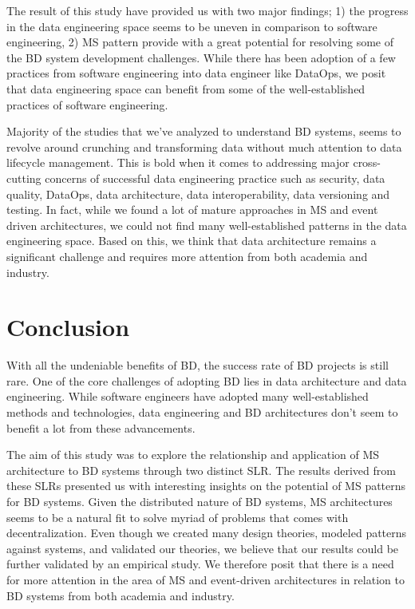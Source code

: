 \documentclass{bmcart}
\begin{document}
The result of this study have provided us with two major findings; 1) the progress in the data engineering space seems to be uneven in comparison to software engineering, 2) MS pattern provide with a great potential for resolving some of the BD system development challenges. While there has been adoption of a few practices from software engineering into data engineer like DataOps, we posit that data engineering space can benefit from some of the well-established practices of software engineering. 

Majority of the studies that we've analyzed to understand BD systems, seems to revolve around crunching and transforming data without much attention to data lifecycle management. This is bold when it comes to addressing major cross-cutting concerns of successful data engineering practice such as security, data quality, DataOps, data architecture, data interoperability, data versioning and testing. In fact, while we found a lot of mature approaches in MS and event driven architectures, we could not find many well-established patterns in the data engineering space. Based on this, we think that data architecture remains a significant challenge and requires more attention from both academia and industry. 



 
\section{Conclusion}
With all the undeniable benefits of BD, the success rate of BD projects is still rare. One of the core challenges of adopting BD lies in data architecture and data engineering. While software engineers have adopted many well-established methods and technologies, data engineering and BD architectures don't seem to benefit a lot from these advancements. 

The aim of this study was to explore the relationship and application of MS architecture to BD systems through two distinct SLR. The results derived from these SLRs presented us with interesting insights on the potential of MS patterns for BD systems. Given the distributed nature of BD systems, MS architectures seems to be a natural fit to solve myriad of problems that comes with decentralization. Even though we created many design theories, modeled patterns against systems, and validated our theories, we believe that our results could be further validated by an empirical study. We therefore posit that there is a need for more attention in the area of MS and event-driven architectures in relation to BD systems from both academia and industry. 
\end{document}
